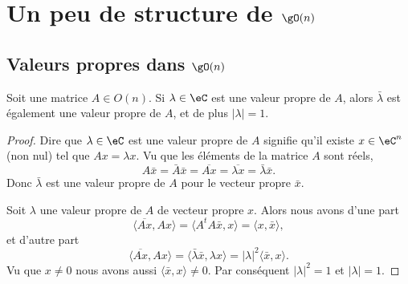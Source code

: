 
\section{Un peu de structure de \texorpdfstring{\( \gO(n)\)}{O(n)}}

\subsection{Valeurs propres dans \( \gO(n)\)}

\begin{proposition}      \label{PROPooVEJGooWnqtMm}
    Soit une matrice \( A\in O(n)\). Si \( \lambda\in \eC\) est une valeur propre de \( A\), alors \( \bar\lambda\) est également une valeur propre de \( A\), et de plus \( | \lambda |=1\).
\end{proposition}

\begin{proof}
    Dire que \( \lambda\in \eC\) est une valeur propre de \( A\) signifie qu'il existe \( x\in \eC^n\) (non nul) tel que \( Ax=\lambda x\). Vu que les éléments de la matrice \( A\) sont réels,
    \begin{equation}
        A\bar x=\bar A\bar x=\overline{ Ax }=\overline{ \lambda x }=\bar \lambda\bar x.
    \end{equation}
    Donc \( \bar \lambda\) est une valeur propre de \( A\) pour le vecteur propre \( \bar x\).

    Soit \( \lambda\)  une valeur propre de \( A\) de vecteur propre \( x\). Alors nous avons d'une part
    \begin{equation}
        \langle \overline{ Ax }, Ax\rangle =\langle A^tA\bar x, x\rangle =\langle x, \bar x\rangle ,
    \end{equation}
    et d'autre part
    \begin{equation}
        \langle \overline{ Ax }, Ax\rangle =\langle \bar \lambda \bar x, \lambda x\rangle =| \lambda |^2\langle \bar x, x\rangle .
    \end{equation}
    Vu que \( x\neq 0\) nous avons aussi \( \langle \bar x, x\rangle \neq 0\). Par conséquent \( | \lambda |^2=1\) et \( | \lambda |=1\).
\end{proof}

